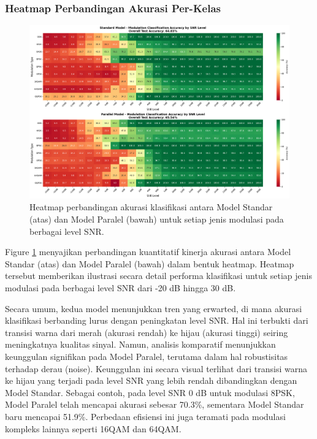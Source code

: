 \documentclass{article}
\begin{document}
\subsubsection{Heatmap Perbandingan Akurasi Per-Kelas} 
\begin{figure}[H]
    \centerline{\includegraphics[width=1.0\textwidth,height=0.3\textheight]{Hasil/Heatmap_overall_testing_accuracy_comparing_2model.png}}
    \caption{Heatmap perbandingan akurasi klasifikasi antara Model Standar (atas) dan Model Paralel (bawah) untuk setiap jenis modulasi pada berbagai level SNR.}
    \label{fig:Figure 4}
\end{figure}
Figure \ref{fig:Figure 4} menyajikan perbandingan kuantitatif kinerja akurasi antara Model Standar (atas) dan Model Paralel (bawah) dalam 
bentuk heatmap. Heatmap tersebut memberikan ilustrasi secara detail performa klasifikasi untuk setiap jenis modulasi pada berbagai level SNR dari 
-20 dB hingga 30 dB. 

Secara umum, kedua model menunjukkan tren yang erwarted, di mana akurasi klasifikasi berbanding lurus dengan peningkatan level SNR. 
Hal ini terbukti dari transisi warna dari merah (akurasi rendah) ke hijau (akurasi tinggi) seiring meningkatnya kualitas sinyal. 
Namun, analisis komparatif menunjukkan keunggulan signifikan pada Model Paralel, terutama dalam hal robustisitas terhadap derau (noise).
Keunggulan ini secara visual terlihat dari transisi warna ke hijau yang terjadi pada level SNR yang lebih rendah dibandingkan dengan Model 
Standar. Sebagai contoh, pada level SNR 0 dB untuk modulasi 8PSK, Model Paralel telah mencapai akurasi sebesar 70.3\%, sementara Model Standar 
baru mencapai 51.9\%. Perbedaan efisiensi ini juga teramati pada modulasi kompleks lainnya seperti 16QAM dan 64QAM. 
\end{document}
